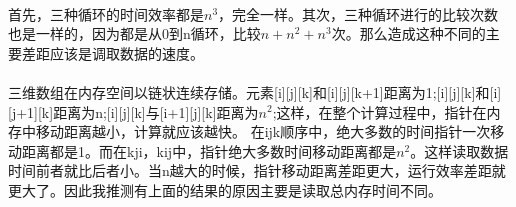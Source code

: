 \documentclass{article}
\begin{document}
\begin{CJK}{UTF8}{gkai}
\paragraph{}首先，三种循环的时间效率都是$n^{3}$，完全一样。其次，三种循环进行的比较次数也是一样的，因为都是从0到n循环，比较$n+n^{2}+n^{3}$次。那么造成这种不同的主要差距应该是调取数据的速度。
\paragraph{}三维数组在内存空间以链状连续存储。元素[i][j][k]和[i][j][k+1]距离为1;[i][j][k]和[i][j+1][k]距离为n;[i][j][k]与[i+1][j][k]距离为$n^{2}$;这样，在整个计算过程中，指针在内存中移动距离越小，计算就应该越快。
在ijk顺序中，绝大多数的时间指针一次移动距离都是1。而在kji，kij中，指针绝大多数时间移动距离都是$n^{2}$。这样读取数据时间前者就比后者小。当n越大的时候，指针移动距离差距更大，运行效率差距就更大了。因此我推测有上面的结果的原因主要是读取总内存时间不同。
\end{CJK}
\end{document}
